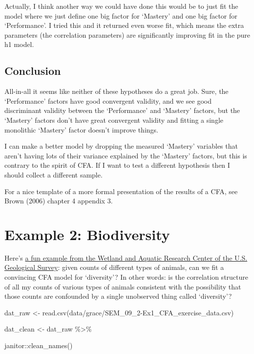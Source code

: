 \documentclass[
  letterpaper,
  DIV=11,
  numbers=noendperiod]{scrreprt}
\newenvironment{Shaded}{\begin{snugshade}}{\end{snugshade}}
\newcommand{\FunctionTok}[1]{\textcolor[rgb]{0.28,0.35,0.67}{#1}}
\newcommand{\NormalTok}[1]{\textcolor[rgb]{0.00,0.23,0.31}{#1}}
\newcommand{\OtherTok}[1]{\textcolor[rgb]{0.00,0.23,0.31}{#1}}
\newcommand{\SpecialCharTok}[1]{\textcolor[rgb]{0.37,0.37,0.37}{#1}}
\newcommand{\StringTok}[1]{\textcolor[rgb]{0.13,0.47,0.30}{#1}}
\begin{document}
Actually, I think another way we could have done this would be to just
fit the model where we just define one big factor for `Mastery' and one
big factor for `Performance'. I tried this and it returned even worse
fit, which means the extra parameters (the correlation parameters) are
significantly improving fit in the pure h1 model.

\hypertarget{conclusion}{%
\subsection{Conclusion}\label{conclusion}}

All-in-all it seems like neither of these hypotheses do a great job.
Sure, the `Performance' factors have good convergent validity, and we
see good discriminant validity between the `Performance' and `Mastery'
factors, but the `Mastery' factors don't have great convergent validity
and fitting a single monolithic `Mastery' factor doesn't improve things.

I can make a better model by dropping the measured `Mastery' variables
that aren't having lots of their variance explained by the `Mastery'
factors, but this is contrary to the spirit of CFA. If I want to test a
different hypothesis then I should collect a different sample.

For a nice template of a more formal presentation of the results of a
CFA, see Brown (2006) chapter 4 appendix 3.

\hypertarget{example-2-biodiversity}{%
\section{Example 2: Biodiversity}\label{example-2-biodiversity}}

Here's
\href{https://d9-wret.s3.us-west-2.amazonaws.com/assets/palladium/production/s3fs-public/atoms/files/SEM_09_2-Ex1_CFA_exercise.pdf}{a
fun example from the Wetland and Aquatic Research Center of the U.S.
Geological Survey}: given counts of different types of animals, can we
fit a convincing CFA model for `diversity'? In other words: is the
correlation structure of all my counts of various types of animals
consistent with the possibility that those counts are confounded by a
single unobserved thing called `diversity'?

\begin{Shaded}
\begin{Highlighting}[]
\NormalTok{dat\_raw }\OtherTok{\textless{}{-}} \FunctionTok{read.csv}\NormalTok{(}\StringTok{\textquotesingle{}data/grace/SEM\_09\_2{-}Ex1\_CFA\_exercise\_data.csv\textquotesingle{}}\NormalTok{)}

\NormalTok{dat\_clean }\OtherTok{\textless{}{-}}\NormalTok{ dat\_raw }\SpecialCharTok{\%\textgreater{}\%}  
  
\NormalTok{  janitor}\SpecialCharTok{::}\FunctionTok{clean\_names}\NormalTok{()}
\end{Highlighting}
\end{Shaded}
\end{document}

